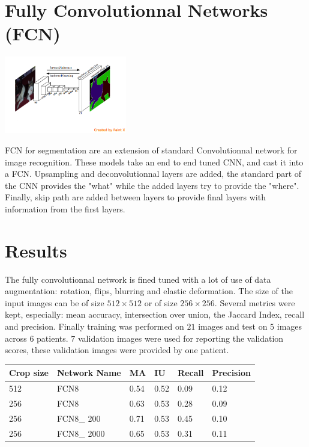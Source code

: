 \documentclass[a0,portrait]{a0poster}
\begin{document}
\begin{multicols}{2}
\section*{Fully Convolutionnal Networks (FCN)}
\begin{center}
\includegraphics[trim={0 3cm 0 0},clip,width = 0.4\textwidth]{FCN.png}
\end{center}

FCN for segmentation are an extension of standard
 Convolutionnal network for image recognition. These models
 take an end to end tuned CNN, and cast it into a FCN.
  Upsampling and deconvolutionnal layers are added, the standard
 part of the CNN provides the "what" while the added layers try to provide the "where". 
Finally, skip path are added between layers to provide final layers 
with information from the first layers.

\section*{Results}

The fully convolutionnal network is fined tuned with a lot of use of data augmentation: rotation, flips, blurring and elastic deformation.
The size of the input images can be of size $512\times512$ or of size $256\times256$.  Several metrics were kept, especially: mean accuracy, intersection over union, the Jaccard Index, recall and precision.
Finally training was performed on $21$ images and test on $5$ images across $6$ patients. $7$ validation images were used for reporting the validation scores, these validation images were provided by one patient.
\begin{center}
\begin{tabular}{l l l l l l}
\toprule
\textbf{Crop size} & \textbf{Network Name} & \textbf{MA} & \textbf{IU} & \textbf{Recall} & \textbf{Precision} \\
\midrule
512 & FCN8 & 0.54 & 0.52 & 0.09 & 0.12 \\
256 & FCN8 & 0.63 & 0.53 & 0.28 & 0.09 \\
256 & FCN8\_ 200 & 0.71 & 0.53 & 0.45 & 0.10 \\
256 & FCN8\_ 2000 & 0.65 & 0.53 & 0.31 & 0.11 \\
\bottomrule
\end{tabular}
\end{center}


\end{multicols}
\end{document}
